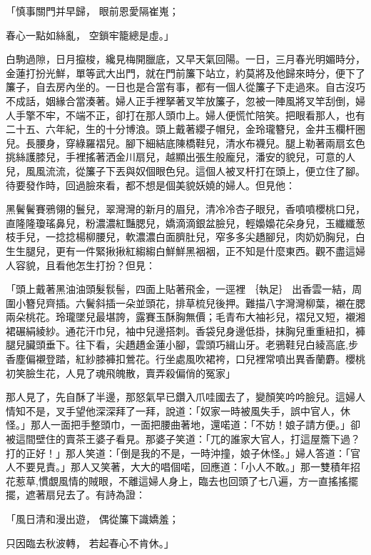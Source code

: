 「慎事關門并早歸，  眼前恩愛隔崔嵬；

春心一點如絲亂，  空鎖牢籠總是虛。」

白駒過隙，日月攛梭，纔見梅開臘底，又早天氣回陽。一日，三月春光明媚時分，金蓮打扮光鮮，單等武大出門，就在門前簾下站立，約莫將及他歸來時分，便下了簾子，自去房內坐的。一日也是合當有事，都有一個人從簾子下走過來。自古沒巧不成話，姻緣合當湊著。婦人正手裡拏著叉竿放簾子，忽被一陣風將叉竿刮倒，婦人手擎不牢，不端不正，卻打在那人頭巾上。婦人便慌忙陪笑。把眼看那人，也有二十五、六年紀，生的十分博浪。頭上戴著纓子帽兒，金玲瓏簪兒，金井玉欄杆圈兒。長腰身，穿綠羅褶兒。腳下細結底陳橋鞋兒，清水布襪兒。腿上勒著兩扇玄色挑絲護膝兒，手裡搖著洒金川扇兒，越顯出張生般龐兒，潘安的貌兒，可意的人兒，風風流流，從簾子下丟與奴個眼色兒。這個人被叉杆打在頭上，便立住了腳。待要發作時，回過臉來看，都不想是個美貌妖嬈的婦人。但見他：

黑鬢鬢賽鴉翎的鬟兒，翠灣灣的新月的眉兒，清冷冷杏子眼兒，香噴噴櫻桃口兒，直隆隆瓊瑤鼻兒，粉濃濃紅豔腮兒，嬌滴滴銀盆臉兒，輕嬝嬝花朵身兒，玉纖纖葱枝手兒，一捻捻楊柳腰兒，軟濃濃白面臍肚兒，窄多多尖趫腳兒，肉奶奶胸兒，白生生腿兒，更有一件緊揪揪紅縐縐白鮮鮮黑裀裀，正不知是什麼東西。觀不盡這婦人容貌，且看他怎生打扮？但見：

「頭上戴著黑油油頭髮䯼髻，四面上貼著飛金，一逕裡
｛執足｝
出香雲一結，周圍小簪兒齊插。六鬢斜插一朵並頭花，排草梳兒後押。難描八字灣灣柳葉，襯在腮兩朵桃花。玲瓏墜兒最堪誇，露賽玉酥胸無價；毛青布大袖衫兒，褶兒又短，襯湘裙碾絹綾紗。通花汗巾兒，袖中兒邊搭刺。香袋兒身邊低掛，抹胸兒重重紐扣，褲腿兒臟頭垂下。往下看，尖趫趫金蓮小腳，雲頭巧緝山牙。老鴉鞋兒白綾高底,步香塵偏襯登踏，紅紗膝褲扣鶯花。行坐處風吹裙袴，口兒裡常噴出異香蘭麝。櫻桃初笑臉生花，人見了魂飛魄散，賣弄殺偏俏的冤家」

那人見了，先自酥了半邊，那怒氣早已鑽入爪哇國去了，變顏笑吟吟臉兒。這婦人情知不是，叉手望他深深拜了一拜，說道：「奴家一時被風失手，誤中官人，休怪。」那人一面把手整頭巾，一面把腰曲著地，還喏道：「不妨！娘子請方便。」卻被這間壁住的賣茶王婆子看見。那婆子笑道：「兀的誰家大官人，打這屋簷下過？打的正好！」那人笑道：「倒是我的不是，一時沖撞，娘子休怪。」婦人答道：「官人不要見責。」那人又笑著，大大的唱個喏，回應道：「小人不敢。」那一雙積年招花惹草,慣覷風情的賊眼，不離這婦人身上，臨去也回頭了七八遍，方一直搖搖擺擺，遮著扇兒去了。有詩為證：

「風日清和漫出遊，  偶從簾下識嬌羞；

只因臨去秋波轉，  若起春心不肯休。」

